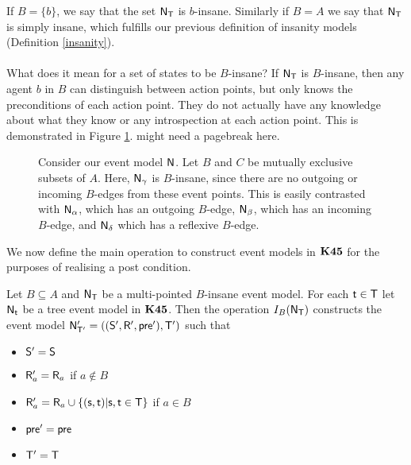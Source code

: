 If $B = \{b\}$, we say that the set $\mathrm{\mathsf{N}}_\mathrm{\mathsf{T}}$ is $b$-insane.
Similarly if $B = A$ we say that $\mathrm{\mathsf{N}}_\mathrm{\mathsf{T}}$ is simply insane, which fulfills
our previous definition of insanity models (Definition \ref{insanity}).\\
\\
What does it mean for a set of states to be $B$-insane?
If $\mathrm{\mathsf{N}}_\mathrm{\mathsf{T}}$ is $B$-insane, then any agent $b$ in $B$ can distinguish between
action points, but only knows the preconditions of each action point.
They do not actually have any knowledge about what they know or any
introspection at each action point.
This is demonstrated in Figure \ref{bInsaneExample}.
\FIXME might need a pagebreak here.

\begin{figure}[ht!]
\centering
{}
\caption{Consider our event model $\mathrm{\mathsf{N}}$. Let $B$ and $C$ be mutually exclusive
  subsets of $A$. Here, $\mathrm{\mathsf{N}}_\gamma$
  is $B$-insane, since there are no outgoing or incoming $B$-edges from these event points.
This is easily contrasted with $\mathrm{\mathsf{N}}_\alpha$, which has an outgoing $B$-edge, $\mathrm{\mathsf{N}}_\beta$, which
has an incoming $B$-edge, and $\mathrm{\mathsf{N}}_\delta$ which has a reflexive $B$-edge.}
\label{bInsaneExample}
\end{figure}

We now define the main operation to construct event models in $\bf K45$ for the
purposes of realising a post condition.

\begin{defn} \label{makeEquivalence}
	Let $B \subseteq A$ and $\mathrm{\mathsf{N}}_\mathrm{\mathsf{T}}$ be a multi-pointed $B$-insane event model.
  For each $\mathrm{\mathsf{t}} \in \mathrm{\mathsf{T}}$ let $\mathrm{\mathsf{N}}_\mathrm{\mathsf{t}}$ be a tree event model in $\bf K45$.
  Then the operation $I_B(\mathrm{\mathsf{N}}_\mathrm{\mathsf{T}})$ constructs the event model $\mathrm{\mathsf{N}}'_{\mathrm{\mathsf{T}}'} =
  ((\mathrm{\mathsf{S}}',\mathrm{\mathsf{R}}',\mathrm{\mathsf{pre}}'),\mathrm{\mathsf{T}}')$ such that
  \begin{itemize}
    \item $\mathrm{\mathsf{S}}' = \mathrm{\mathsf{S}}$
    \item $\mathrm{\mathsf{R}}'_a = \mathrm{\mathsf{R}}_a$ if $a \notin B$
    \item $\mathrm{\mathsf{R}}'_a = \mathrm{\mathsf{R}}_a \cup \{(\mathrm{\mathsf{s}}, \mathrm{\mathsf{t}}) | \mathrm{\mathsf{s}}, \mathrm{\mathsf{t}} \in \mathrm{\mathsf{T}}\}$ if $a
    \in B$
    \item $\mathrm{\mathsf{pre}}' = \mathrm{\mathsf{pre}}$
    \item $\mathrm{\mathsf{T}}' = \mathrm{\mathsf{T}}$
  \end{itemize}
\end{defn}

